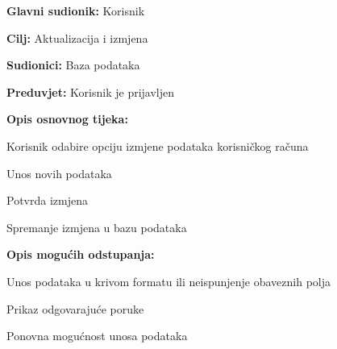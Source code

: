 		
			\noindent {}
			\begin{packed_item}
				
				\item \textbf{Glavni sudionik: }Korisnik
				\item  \textbf{Cilj:} Aktualizacija i izmjena 
				\item  \textbf{Sudionici:} Baza podataka
				\item  \textbf{Preduvjet:} Korisnik je prijavljen
				\item  \textbf{Opis osnovnog tijeka:}
				
				\item[] \begin{packed_enum}
					
					\item Korisnik odabire opciju izmjene podataka korisničkog računa
					\item Unos novih podataka
					\item Potvrda izmjena
					\item Spremanje izmjena u bazu podataka
				\end{packed_enum}
				
				\item  \textbf{Opis mogućih odstupanja:}
				
				\item[] \begin{packed_item}
					
					\item[3.a] Unos podataka u krivom formatu ili neispunjenje obaveznih polja
					\item[] \begin{packed_enum}
						
						\item Prikaz odgovarajuće poruke
						\item Ponovna mogućnost unosa podataka
						
					\end{packed_enum}
					
				\end{packed_item}
			\end{packed_item}
		
